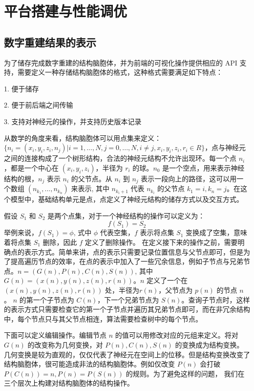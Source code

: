 \chapter{平台搭建与性能调优}

\section{数字重建结果的表示}
为了储存完成数字重建的结构脑胞体，并为前端的可视化操作提供相应的 API 支持，需要定义一种存储结构脑胞体的格式，这种格式需要满足如下特点：

1. 便于储存

2. 便于前后端之间传输

3. 支持对神经元的操作，并支持历史版本记录

从数学的角度来看，结构脑胞体可以用点集来定义：$\{ n_i = (x_i, y_i, z_i, n_j) | i = 1,..., N, j = 0,..., N, i \neq j, x_i, y_i, z_i, r_i \in R \}$，点与神经元之间的连接构成了一个树形结构，合法的神经元结构不允许出现环。每一个点 $n_i$，都是一个中心在 $(x_i, y_i, z_i)$，半径为 $r_i$ 的球。$n_0$ 是一个空点，用来表示神经结构的根，$n_j$ 表示 $n_i$ 的父节点。从 $n_i$ 到 $n_j$ 表示一段向上的路径，这可以用一个数组 $(n_{k_1},...,n_{k_n})$ 来表示, 其中 $n_{k_i+1}$ 代表 $n_{k_i}$ 的父节点 $k_1 = i, k_n = j$。在这个模型中，基础结构单元是点，点定义了神经元结构的储存方式以及交互方式。

假设 $S_1$ 和 $S_2$ 是两个点集，对于一个神经结构的操作可以定义为：
$$f(S_1) = S_2$$
举例来说，$f(S_1)= \phi$, 式中 $\phi$ 代表空集，$f$ 表示将点集 $S_1$ 变换成了空集，意味着将点集 $S_1$ 删除，因此 $f$ 定义了删除操作。
在定义接下来的操作之前，需要明确点的表示方式。简单来讲，点的表示只需要记录位置信息与父节点即可，但是为了提高遍历节点的效率，在点的表示中加入了一些冗余信息，例如子节点与兄弟节点。$n=(G(n), P(n), C(n), S(n))$, 其中 $G(n) = (x(n), y(n), z(n), r(n))$。$n$ 定义了一个在$(x(n), y(n), z(n), r(n))$ 处，半径为$r(n)$，父节点为 $p(n)$ 的节点 $n$。 $n$ 的第一个子节点为 $C(n)$，下一个兄弟节点为 $S(n)$。查询子节点时，这样的表示方式只需要检查它的第一个子节点并遍历其兄弟节点即可，而在非冗余结构中，每个节点只与其父节点相连，算法需要检查树中的每个节点。

下面可以定义编辑操作。编辑节点 $n$ 的值可以用修改对应的元组来定义。将对 $G(n)$ 的改变称为几何变换，对 $P(n), C(n), S(n)$ 的变换成为结构变换。几何变换是较为直观的，仅仅代表了神经元在空间上的位移。但是结构变换改变了结构脑胞体，很可能造成非法的结构脑胞体。例如仅改变 $P(n)$ 会打破 $P(C(n)) = n, P(n) = P(S(n))$ 的规则。为了避免这样的问题， 我们在三个层次上构建对结构脑胞体的结构操作。

